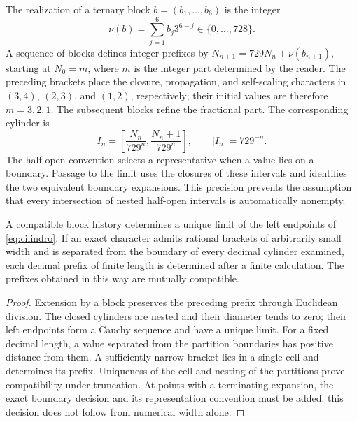 The realization of a ternary block \(b=(b_1,\ldots,b_6)\) is the integer
\[
 \nu(b)=\sum_{j=1}^6b_j3^{6-j}\in\{0,\ldots,728\}.
\]
A sequence of blocks defines integer prefixes by \(N_{n+1}=729N_n+\nu(b_{n+1})\), starting at \(N_0=m\), where \(m\) is the integer part determined by the reader. The preceding brackets place the closure, propagation, and self-scaling characters in \((3,4)\), \((2,3)\), and \((1,2)\), respectively; their initial values are therefore \(m=3,2,1\). The subsequent blocks refine the fractional part. The corresponding cylinder is
\begin{equation}
 I_n=\left[\frac{N_n}{729^n},\frac{N_n+1}{729^n}\right],
 \qquad |I_n|=729^{-n}.
 \label{eq:cilindro}
\end{equation}
The half-open convention selects a representative when a value lies on a boundary. Passage to the limit uses the closures of these intervals and identifies the two equivalent boundary expansions. This precision prevents the assumption that every intersection of nested half-open intervals is automatically nonempty.

\begin{theorem}
A compatible block history determines a unique limit of the left endpoints of \eqref{eq:cilindro}. If an exact character admits rational brackets of arbitrarily small width and is separated from the boundary of every decimal cylinder examined, each decimal prefix of finite length is determined after a finite calculation. The prefixes obtained in this way are mutually compatible.
\end{theorem}
\begin{proof}
Extension by a block preserves the preceding prefix through Euclidean division. The closed cylinders are nested and their diameter tends to zero; their left endpoints form a Cauchy sequence and have a unique limit. For a fixed decimal length, a value separated from the partition boundaries has positive distance from them. A sufficiently narrow bracket lies in a single cell and determines its prefix. Uniqueness of the cell and nesting of the partitions prove compatibility under truncation. At points with a terminating expansion, the exact boundary decision and its representation convention must be added; this decision does not follow from numerical width alone.
\end{proof}

